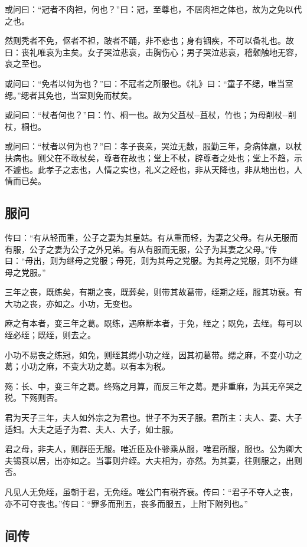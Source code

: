 \documentclass[]{article}
\begin{document}
或问曰：``冠者不肉袒，何也？''曰：冠，至尊也，不居肉袒之体也，故为之免以代之也。

然则秃者不免，伛者不袒，跛者不踊，非不悲也；身有锢疾，不可以备礼也。故曰：丧礼唯哀为主矣。女子哭泣悲哀，击胸伤心；男子哭泣悲哀，稽颡触地无容，哀之至也。

或问曰：``免者以何为也？''曰：不冠者之所服也。《礼》曰：``童子不缌，唯当室缌。''缌者其免也，当室则免而杖矣。

或问曰：``杖者何也？''曰：竹、桐一也。故为父苴杖-\/-苴杖，竹也；为母削杖-\/-削杖，桐也。

或问曰：``杖者以何为也？''曰：孝子丧亲，哭泣无数，服勤三年，身病体羸，以杖扶病也。则父在不敢杖矣，尊者在故也；堂上不杖，辟尊者之处也；堂上不趋，示不遽也。此孝子之志也，人情之实也，礼义之经也，非从天降也，非从地出也，人情而已矣。

\hypertarget{header-n794}{%
\subsection{服问}\label{header-n794}}

传曰：``有从轻而重，公子之妻为其皇姑。有从重而轻，为妻之父母。有从无服而有服，公子之妻为公子之外兄弟。有从有服而无服，公子为其妻之父母。''传曰：``母出，则为继母之党服；母死，则为其母之党服。为其母之党服，则不为继母之党服。''

三年之丧，既练矣，有期之丧，既葬矣，则带其故葛带，绖期之绖，服其功衰。有大功之丧，亦如之。小功，无变也。

麻之有本者，变三年之葛。既练，遇麻断本者，于免，绖之；既免，去绖。每可以绖必绖；既绖，则去之。

小功不易丧之练冠，如免，则绖其缌小功之绖，因其初葛带。缌之麻，不变小功之葛；小功之麻，不变大功之葛。以有本为税。

殇：长、中，变三年之葛。终殇之月算，而反三年之葛。是非重麻，为其无卒哭之税。下殇则否。

君为天子三年，夫人如外宗之为君也。世子不为天子服。君所主：夫人、妻、大子适妇。大夫之适子为君、夫人、大子，如士服。

君之母，非夫人，则群臣无服。唯近臣及仆骖乘从服，唯君所服，服也。公为卿大夫锡衰以居，出亦如之。当事则弁绖。大夫相为，亦然。为其妻，往则服之，出则否。

凡见人无免绖，虽朝于君，无免绖。唯公门有税齐衰。传曰：``君子不夺人之丧，亦不可夺丧也。''传曰：``罪多而刑五，丧多而服五，上附下附列也。''

\hypertarget{header-n805}{%
\subsection{间传}\label{header-n805}}
\end{document}
